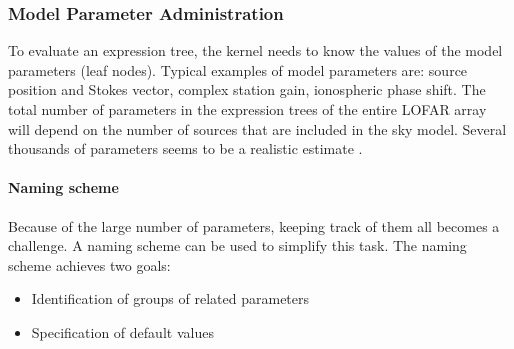 \documentclass[10pt]{lofar}
\begin{document}
\subsubsection{Model Parameter Administration}
\label{subsubsec:admin-model-parms}

To evaluate an expression tree, the kernel needs to know the values of the model
parameters (leaf nodes). Typical examples of model parameters are: source
position and Stokes vector, complex station gain, ionospheric phase shift. The
total number of parameters in the expression trees of the entire LOFAR array
will depend on the number of sources that are included in the sky model. Several
thousands of parameters seems to be a realistic estimate
\cite{LOFAR-ASTRON-ADD-015}.

\paragraph{Naming scheme}
Because of the large number of parameters, keeping track of them all becomes a
challenge. A naming scheme can be used to simplify this task. The naming scheme
achieves two goals:
\begin{itemize}
\item Identification of groups of related parameters
\item Specification of default values
\end{itemize}
\end{document}
